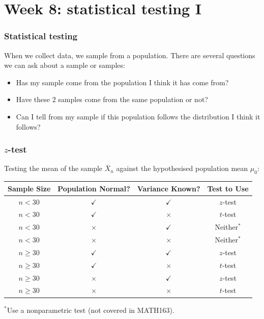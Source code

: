\documentclass[t,8pt]{beamer}
\begin{document}

\section{Week 8: statistical testing I}

\begin{frame}
	\frametitle{Statistical testing}
	When we collect data, we sample from a population. There are several questions we can ask about a sample or samples:
	\begin{itemize}
		\item Has my sample come from the population I think it has come from?
		\item Have these $2$ samples come from the same population or not?
		\item Can I tell from my sample if this population follows the distribution I think it follows?
	\end{itemize}
\end{frame}

\begin{frame}
	\frametitle{$z$-test}
	Testing the mean of the sample $\bar X_n$ against the hypothesised population mean $\mu_0$:
	\begin{table}[h]
		\centering
		\begin{tabular}{|c|c|c|c|}
			\hline
			\textbf{Sample Size} & \textbf{Population Normal?} & \textbf{Variance Known?} & \textbf{Test to Use} \\ 
			\hline
			\( n < 30 \) & $\checkmark$ & $\checkmark$ & \( z \)-test \\ 
			\( n < 30 \) & $\checkmark$ & $\times$      & \( t \)-test \\ 
			\( n < 30 \) & $\times$      & $\checkmark$ & Neither$^*$ \\ 
			\( n < 30 \) & $\times$      & $\times$     & Neither$^*$ \\ 
			\( n \ge 30 \) & $\checkmark$ & $\checkmark$ & \( z \)-test \\ 
			\( n \ge 30 \) & $\checkmark$ & $\times$      & \( t \)-test \\ 
			\( n \ge 30 \) & $\times$      & $\checkmark$ & \( z \)-test \\ 
			\( n \ge 30 \) & $\times$      & $\times$     & \( t \)-test \\ 
			\hline
		\end{tabular}
	\end{table}
	$^*$Use a nonparametric test (not covered in MATH163).
\end{frame}
\end{document}
